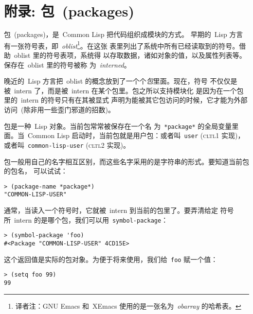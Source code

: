 
\chapter{附录: 包~(packages)}
\label{chap:packages}

包~(packages)，是~Common Lisp 把代码组织成模块的方式。
早期的~Lisp 方言有一张符号表，即~\emph{oblist}\footnote{译者注：GNU
  Emacs 和~XEmacs 使用的是一张名为~\emph{obarray} 的哈希表。}。在这张
表里列出了系统中所有已经读取到的符号。借助~oblist 里的符号表项，系统得
以存取数据，诸如对象的值，以及属性列表等。保存在~oblist 里的符号被称
为~\emph{interned}。

晚近的~Lisp 方言把~oblist 的概念放到了一个个\emph{包}里面。现在，符号
不仅仅是被~intern 了，而是被~intern 在某个包里。包之所以支持模块化
是因为在一个包里的~intern 的符号只有在其被显式
声明为能被其它包访问的时候，它才能为外部访问~(除非用一些歪门邪道的招数)。

包是一种~Lisp 对象。当前包常常被保存在一个名
为~\texttt{*package*} 的全局变量里面。当~Common Lisp
启动时，当前包就是用户包：或者叫~\texttt{user}
(\textsc{cltl}1 实现)，或者叫~\texttt{common-lisp-user}
(\textsc{cltl}2 实现)。

包一般用自己的名字相互区别，而这些名字采用的是字符串的形式。要知道当前包的包名，
可以试试：
\begin{verbatim}
> (package-name *package*)
"COMMON-LISP-USER"
\end{verbatim}

通常，当读入一个符号时，它就被~intern 到当前的包里了。要弄清给定
符号所~intern 的是哪个包，我们可以用~\texttt{symbol-package}：
\begin{verbatim}
> (symbol-package 'foo)
#<Package "COMMON-LISP-USER" 4CD15E>
\end{verbatim}
这个返回值是实际的包对象。为便于将来使用，我们给~\texttt{foo} 赋一个值：
\begin{verbatim}
> (setq foo 99)
99
\end{verbatim}

